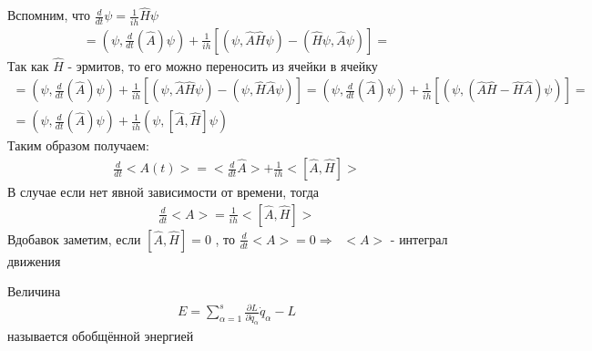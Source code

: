 \documentclass[__main__.tex]{subfiles}
\begin{document}
Вспомним, что  $\frac{d}{dt}\psi = \frac{1}{ih}\widehat{H}\psi$
\begin{gather*}
	= \left(\psi,\frac{d}{dt}(\hat{A})\psi\right)+\frac{1}{ih}\left[(\psi,\widehat{A}\widehat{H}\psi) - (\widehat{H}\psi,\widehat{A}\psi)\right] = 
\end{gather*}
Так как $\widehat{H}$ - эрмитов, то его можно переносить из ячейки в ячейку
\begin{gather*}
	= \left(\psi,\frac{d}{dt}(\hat{A})\psi\right)+\frac{1}{ih}\left[(\psi,\widehat{A}\widehat{H}\psi) - (\psi,\widehat{H}\widehat{A}\psi)\right] = \left(\psi,\frac{d}{dt}(\hat{A})\psi\right)+\frac{1}{ih}\left[(\psi,(\hat{A}\hat{H}-\hat{H}\hat{A})\psi)\right] =\\ = \left(\psi,\frac{d}{dt}(\hat{A})\psi\right)+\frac{1}{ih}(\psi,[\hat{A},\hat{H}]\psi)
\end{gather*}
Таким образом получаем:
\begin{gather*}
	\frac{d}{dt}<A(t)> = <\frac{d}{dt}\hat{A}>+\frac{1}{ih}<[\hat{A},\hat{H}]>
\end{gather*}
В случае если нет явной зависимости от времени, тогда
\begin{gather*}
	\frac{d}{dt}<A>=\frac{1}{ih}<[\hat{A},\hat{H}]>
\end{gather*}
Вдобавок заметим, если $[\hat{A},\hat{H}] = 0$ , то $\frac{d}{dt}<A> = 0 \Rightarrow \;\;<A>$ - интеграл движения

\begin{definition}
		Величина
		\begin{gather*}
		E = \sum_{\alpha=1}^{s}\frac{\partial{L}}{\partial{\dot{q}_\alpha}}\dot{q}_\alpha - L
		\end{gather*}
		называется обобщённой энергией
	\end{definition}
	
\end{document}
